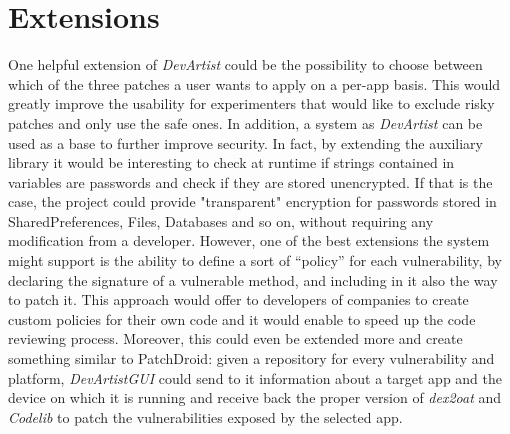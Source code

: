 \section{Extensions}
One helpful extension of \emph{DevArtist} could be the possibility to choose between which of the three patches a user wants to apply on a per-app basis. This would greatly improve the usability for experimenters that would like to exclude risky patches and only use the safe ones.\newline
In addition, a system as \emph{DevArtist} can be used as a base to further improve security. In fact, by extending the auxiliary library it would be interesting to check at runtime if strings contained in variables are passwords and check if they are stored unencrypted. If that is the case, the project could provide "transparent" encryption for passwords stored in SharedPreferences, Files, Databases and so on, without requiring any modification from a developer.\newline
However, one of the best extensions the system might support is the ability to define a sort of \enquote{policy} for each vulnerability, by declaring the signature of a vulnerable method, and including in it also the way to patch it. This approach would offer to developers of companies to create custom policies for their own code and it would enable to speed up the code reviewing process.\newline
Moreover, this could even be extended more and create something similar to PatchDroid\cite{patchdroid}: given a repository for every vulnerability and platform, \emph{DevArtistGUI} could send to it information about a target app and the device on which it is running and receive back the proper version of \emph{dex2oat} and \emph{Codelib} to patch the vulnerabilities exposed by the selected app.\newline


